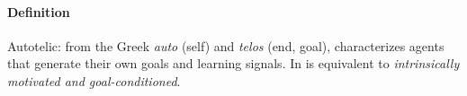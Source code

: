 \begin{tcolorbox}
\small
\paragraph{Definition}
\gls{Autotelic}: from the Greek \textit{auto} (self) and \textit{telos} (end, goal), characterizes agents that generate their own goals and learning signals. In is equivalent to \textit{intrinsically motivated and goal-conditioned}.
\end{tcolorbox}